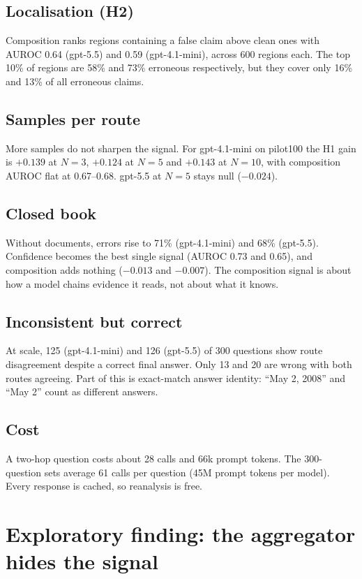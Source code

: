 \documentclass[11pt]{article}
\begin{document}
\subsection{Localisation (H2)}
Composition ranks regions containing a false claim above clean ones with AUROC 0.64
(gpt-5.5) and 0.59 (gpt-4.1-mini), across 600 regions each. The top 10\% of regions are 58\%
and 73\% erroneous respectively, but they cover only 16\% and 13\% of all erroneous claims.

\subsection{Samples per route}
More samples do not sharpen the signal. For gpt-4.1-mini on pilot100 the H1 gain is $+0.139$
at $N = 3$, $+0.124$ at $N = 5$ and $+0.143$ at $N = 10$, with composition AUROC flat at
0.67--0.68. gpt-5.5 at $N = 5$ stays null ($-0.024$).

\subsection{Closed book}
Without documents, errors rise to 71\% (gpt-4.1-mini) and 68\% (gpt-5.5). Confidence becomes
the best single signal (AUROC 0.73 and 0.65), and composition adds nothing ($-0.013$ and
$-0.007$). The composition signal is about how a model chains evidence it reads, not about
what it knows.

\subsection{Inconsistent but correct}
At scale, 125 (gpt-4.1-mini) and 126 (gpt-5.5) of 300 questions show route disagreement
despite a correct final answer. Only 13 and 20 are wrong with both routes agreeing. Part of
this is exact-match answer identity: ``May 2, 2008'' and ``May 2'' count as different
answers.

\subsection{Cost}
A two-hop question costs about 28 calls and 66k prompt tokens. The 300-question sets average
61 calls per question (45M prompt tokens per model). Every response is cached, so
reanalysis is free.

\section{Exploratory finding: the aggregator hides the signal}
\end{document}
